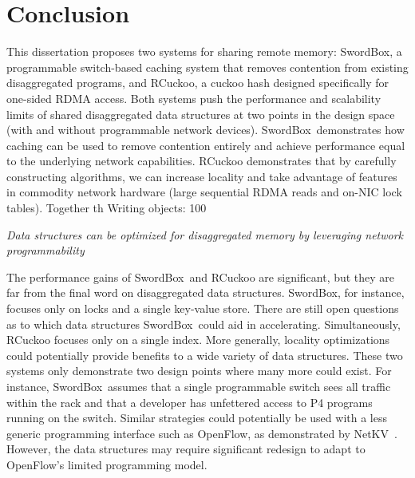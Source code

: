 \documentclass[12pt]{ucsddissertation}
\newcommand{\sword}{SwordBox}
\begin{document}

% 

%


%
% 



\chapter{Conclusion}

This dissertation proposes two systems for sharing remote memory: \sword, a programmable
switch-based caching system that removes contention from existing disaggregated programs, and
RCuckoo, a cuckoo hash designed specifically for one-sided RDMA access. Both systems push the
performance and scalability limits of shared disaggregated data structures at two points in the
design space (with and without programmable network devices). \sword\ demonstrates how caching can
be used to remove contention entirely and achieve performance equal to the underlying network
capabilities. RCuckoo demonstrates that by carefully constructing algorithms, we can increase
locality and take advantage of features in commodity network hardware (large sequential RDMA reads
and on-NIC lock tables). Together th
Writing objects: 100%

\begin{center}
\textit{Data structures can be optimized for disaggregated memory by leveraging network programmability} \\
\end{center}

The performance gains of \sword\ and RCuckoo are significant, but they are far from the final word
on disaggregated data structures. \sword, for instance, focuses only on locks and a single key-value
store. There are still open questions as to which data structures \sword\ could aid in accelerating.
Simultaneously, RCuckoo focuses only on a single index. More generally, locality optimizations could
potentially provide benefits to a wide variety of data structures. These two systems only
demonstrate two design points where many more could exist. For instance, \sword\ assumes that a
single programmable switch sees all traffic within the rack and that a developer has unfettered
access to P4 programs running on the switch. Similar strategies could potentially be used with a
less generic programming interface such as OpenFlow, as demonstrated by NetKV~\cite{netkv}. However,
the data structures may require significant redesign to adapt to OpenFlow's limited programming
model.
\end{document}
